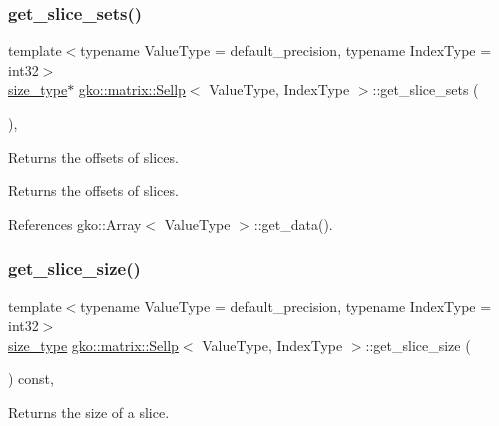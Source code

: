\subsubsection{\texorpdfstring{get\+\_\+slice\+\_\+sets()}{get\_slice\_sets()}}
{\footnotesize\ttfamily template$<$typename Value\+Type = default\+\_\+precision, typename Index\+Type = int32$>$ \\
\hyperlink{namespacegko_a6e5c95df0ae4e47aab2f604a22d98ee7}{size\+\_\+type}$\ast$ \hyperlink{classgko_1_1matrix_1_1Sellp}{gko\+::matrix\+::\+Sellp}$<$ Value\+Type, Index\+Type $>$\+::get\+\_\+slice\+\_\+sets (\begin{DoxyParamCaption}{ }\end{DoxyParamCaption})\hspace{0.3cm}{\ttfamily [inline]}, {\ttfamily [noexcept]}}



Returns the offsets of slices. 

\begin{DoxyReturn}{Returns}
the offsets of slices. 
\end{DoxyReturn}


References gko\+::\+Array$<$ Value\+Type $>$\+::get\+\_\+data().

\mbox{\label{classgko_1_1matrix_1_1Sellp_a0554e79b672f35df5dd01cb467850227}} 
\subsubsection{\texorpdfstring{get\+\_\+slice\+\_\+size()}{get\_slice\_size()}}
{\footnotesize\ttfamily template$<$typename Value\+Type = default\+\_\+precision, typename Index\+Type = int32$>$ \\
\hyperlink{namespacegko_a6e5c95df0ae4e47aab2f604a22d98ee7}{size\+\_\+type} \hyperlink{classgko_1_1matrix_1_1Sellp}{gko\+::matrix\+::\+Sellp}$<$ Value\+Type, Index\+Type $>$\+::get\+\_\+slice\+\_\+size (\begin{DoxyParamCaption}{ }\end{DoxyParamCaption}) const\hspace{0.3cm}{\ttfamily [inline]}, {\ttfamily [noexcept]}}



Returns the size of a slice. 

